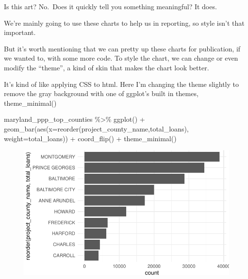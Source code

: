 \documentclass[
  letterpaper,
  DIV=11,
  numbers=noendperiod]{scrreprt}
\newenvironment{Shaded}{\begin{snugshade}}{\end{snugshade}}
\newcommand{\AttributeTok}[1]{\textcolor[rgb]{0.40,0.45,0.13}{#1}}
\newcommand{\FunctionTok}[1]{\textcolor[rgb]{0.28,0.35,0.67}{#1}}
\newcommand{\NormalTok}[1]{\textcolor[rgb]{0.00,0.23,0.31}{#1}}
\newcommand{\SpecialCharTok}[1]{\textcolor[rgb]{0.37,0.37,0.37}{#1}}
\begin{document}
Is this art? No.~Does it quickly tell you something meaningful? It does.

We're mainly going to use these charts to help us in reporting, so style
isn't that important.

But it's worth mentioning that we can pretty up these charts for
publication, if we wanted to, with some more code. To style the chart,
we can change or even modify the ``theme'', a kind of skin that makes
the chart look better.

It's kind of like applying CSS to html. Here I'm changing the theme
slightly to remove the gray background with one of ggplot's built in
themes, theme\_minimal()

\begin{Shaded}
\begin{Highlighting}[]
\NormalTok{maryland\_ppp\_top\_counties }\SpecialCharTok{\%\textgreater{}\%}
  \FunctionTok{ggplot}\NormalTok{() }\SpecialCharTok{+}
  \FunctionTok{geom\_bar}\NormalTok{(}\FunctionTok{aes}\NormalTok{(}\AttributeTok{x=}\FunctionTok{reorder}\NormalTok{(project\_county\_name,total\_loans), }\AttributeTok{weight=}\NormalTok{total\_loans)) }\SpecialCharTok{+}
  \FunctionTok{coord\_flip}\NormalTok{() }\SpecialCharTok{+}
  \FunctionTok{theme\_minimal}\NormalTok{()}
\end{Highlighting}
\end{Shaded}

\begin{figure}[H]

{\centering \includegraphics{./visualizing-for-reporting_files/figure-pdf/unnamed-chunk-8-1.pdf}

}

\end{figure}
\end{document}
